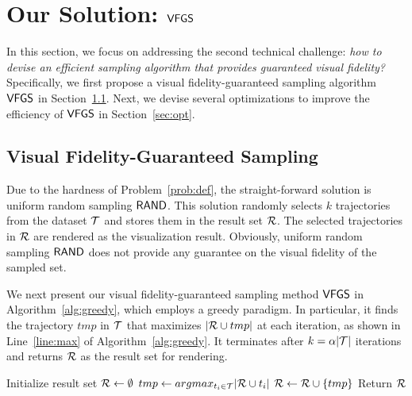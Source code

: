 \section{Our Solution: $\mathsf{VFGS}$}\label{sec:sol}
In this section, we focus on addressing the second technical challenge: \emph{how to devise an efficient sampling algorithm that provides guaranteed visual fidelity?}
Specifically, we first propose a visual fidelity-guaranteed sampling algorithm $\mathsf{VFGS}$ in Section~\ref{sec:greedy}. Next, we devise several optimizations to improve the efficiency of $\mathsf{VFGS}$ in Section~\ref{sec:opt}.

\subsection{Visual Fidelity-Guaranteed Sampling}\label{sec:greedy}
Due to the hardness of Problem~\ref{prob:def}, the straight-forward solution is uniform random sampling $\mathsf{RAND}$.
This solution randomly selects $k$ trajectories from the dataset $\mathcal{T}$ and stores them in the result set $\mathcal{R}$. The selected trajectories in $\mathcal{R}$ are rendered as the visualization result.
Obviously, uniform random sampling $\mathsf{RAND}$ does not provide any guarantee on the visual fidelity of the sampled set.

We next present our visual fidelity-guaranteed sampling method $\mathsf{VFGS}$ in Algorithm~\ref{alg:greedy}, which employs a greedy paradigm.
In particular, it finds the trajectory $tmp$ in $\mathcal{T}$ that maximizes $|\mathcal{R} \cup tmp|$ at each iteration, as shown in Line~\ref{line:max} of Algorithm~\ref{alg:greedy}.
It terminates after $k=\alpha |\mathcal{T}|$ iterations and returns $\mathcal{R}$ as the result set for rendering.

\begin{algorithm}
    \caption{$\vats(\D,k=\alpha |\D|)$} \label{alg:greedy}
    \begin{algorithmic}[1]
    \State Initialize result set $\mathcal{R} \leftarrow \emptyset$
        \State $tmp \leftarrow argmax_{t_i \in \mathcal{T}} |\mathcal{R} \cup t_i|$ \label{line:max}
        \State $\mathcal{R} \leftarrow \mathcal{R} \cup \{ tmp \}$
    \EndWhile
    \State Return $\mathcal{R}$
    \end{algorithmic}
\end{algorithm}

